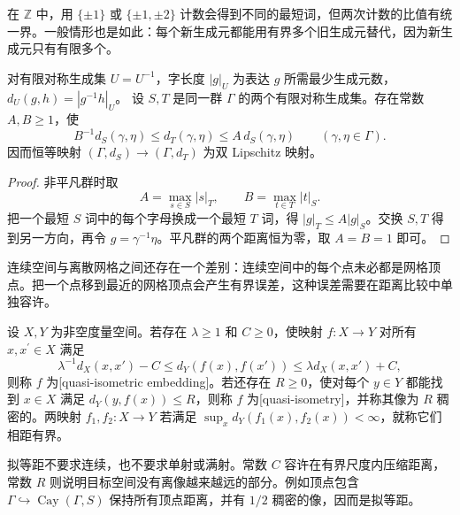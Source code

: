 在 \(\mathbb Z\) 中，用 \(\{\pm1\}\) 或 \(\{\pm1,\pm2\}\) 计数会得到不同的最短词，但两次计数的比值有统一界。一般情形也是如此：每个新生成元都能用有界多个旧生成元替代，因为新生成元只有有限多个。

\begin{proposition}\label{g3:prop:D-word-metrics}
	对有限对称生成集 \(U=U^{-1}\)，字长度 \(|g|_U\) 为表达 \(g\) 所需最少生成元数，\(d_U(g,h)=|g^{-1}h|_U\)。
	设 \(S,T\) 是同一群 \(\Gamma\) 的两个有限对称生成集。存在常数 \(A,B\ge1\)，使
	\begin{equation}\label{g3:eq:D-change-generators}
		B^{-1}d_S(\gamma,\eta)\le d_T(\gamma,\eta)
		\le A\,d_S(\gamma,\eta)
		\qquad(\gamma,\eta\in\Gamma).
	\end{equation}
	因而恒等映射 \((\Gamma,d_S)\to(\Gamma,d_T)\) 为双 Lipschitz 映射。
\end{proposition}
\begin{proof}
	非平凡群时取
	\[
		A=\max_{s\in S}|s|_T,\qquad B=\max_{t\in T}|t|_S.
	\]
	把一个最短 \(S\) 词中的每个字母换成一个最短 \(T\) 词，得
	\(|g|_T\le A|g|_S\)。交换 \(S,T\) 得到另一方向，再令 \(g=\gamma^{-1}\eta\)。平凡群的两个距离恒为零，取 \(A=B=1\) 即可。
\end{proof}

连续空间与离散网格之间还存在一个差别：连续空间中的每个点未必都是网格顶点。把一个点移到最近的网格顶点会产生有界误差，这种误差需要在距离比较中单独容许。

\begin{definition}\label{g3:def:D-quasi-isometry}
	设 \(X,Y\) 为非空度量空间。若存在 \(\lambda\ge1\) 和 \(C\ge0\)，使映射 \(f:X\to Y\) 对所有 \(x,x^\prime\in X\) 满足
	\begin{equation}\label{g3:eq:D-quasi-isometry-inequalities}
		\lambda^{-1}d_X(x,x')-C
		\le d_Y(f(x),f(x'))
		\le\lambda d_X(x,x')+C,
	\end{equation}
	则称 \(f\) 为[quasi-isometric embedding]。若还存在 \(R\ge0\)，使对每个 \(y\in Y\) 都能找到 \(x\in X\) 满足 \(d_Y(y,f(x))\le R\)，则称 \(f\) 为[quasi-isometry]，并称其像为 \(R\) 稠密的。两映射 \(f_1,f_2:X\to Y\) 若满足 \(\sup_xd_Y(f_1(x),f_2(x))<\infty\)，就称它们相距有界。
\end{definition}

拟等距不要求连续，也不要求单射或满射。常数 \(C\) 容许在有界尺度内压缩距离，常数 \(R\) 则说明目标空间没有离像越来越远的部分。例如顶点包含
\(\Gamma\hookrightarrow\operatorname{Cay}(\Gamma,S)\)
保持所有顶点距离，并有 \(1/2\) 稠密的像，因而是拟等距。

